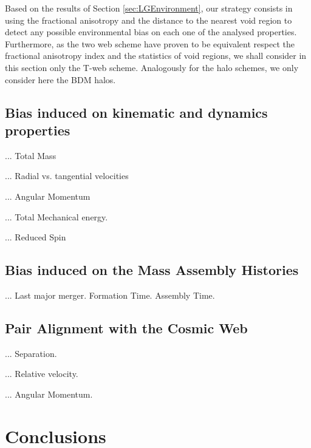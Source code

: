 \documentclass[usenatbib]{latex/mn2e}
\begin{document}
Based on the results of Section \ref{sec:LGEnvironment}, our strategy 
consists in using the fractional anisotropy and the distance to the 
nearest void region to detect any possible environmental bias on each
one of the analysed properties. Furthermore, as the two web scheme have
proven to be equivalent respect the fractional anisotropy index and the
statistics of void regions, we shall consider in this section only the 
T-web scheme. Analogously for the halo schemes, we only consider here the
BDM halos.




\subsection{Bias induced on kinematic and dynamics properties}
\label{subsec:bias_kinematic}

... Total Mass

... Radial vs. tangential velocities

... Angular Momentum

... Total Mechanical energy.

... Reduced Spin


\subsection{Bias induced on the Mass Assembly Histories}
\label{subsec:bias_MAH}

... Last major merger. Formation Time. Assembly Time.

\subsection{Pair Alignment with the Cosmic Web}
\label{subsec:alignment_cosmic_web}

... Separation.

... Relative velocity.

... Angular Momentum.


\section{Conclusions}
\label{sec:conclusions}
\end{document}
